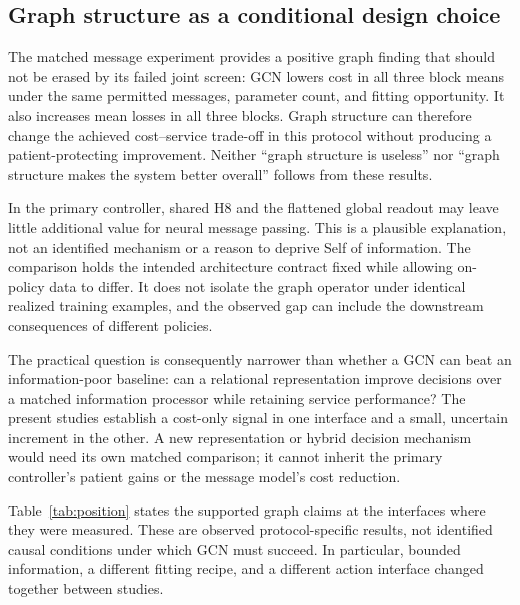\documentclass[preprint,12pt]{elsarticle}
\begin{document}
\subsection{Graph structure as a conditional design choice}
The matched message experiment provides a positive graph finding that should
not be erased by its failed joint screen: GCN lowers cost in all three block
means under the same permitted messages, parameter count, and fitting opportunity.
It also increases mean losses in all three blocks. Graph structure can therefore
change the achieved cost--service trade-off in this protocol without producing
a patient-protecting improvement. Neither ``graph structure is useless'' nor
``graph structure makes the system better overall'' follows from these results.

In the primary controller, shared H8 and the flattened global readout may leave little additional value for
neural message passing. This is a plausible explanation, not an identified
mechanism or a reason to deprive Self of information. The comparison holds the
intended architecture contract fixed while allowing on-policy data to differ.
It does not isolate the graph operator under identical realized training
examples, and the observed gap can include the downstream consequences of
different policies.

The practical question is consequently narrower than whether a GCN can beat
an information-poor baseline: can a relational representation improve decisions
over a matched information processor while retaining service performance?
The present studies establish a cost-only signal in one interface and a small,
uncertain increment in the other. A new representation or hybrid decision
mechanism would need its own matched comparison; it cannot inherit the primary
controller's patient gains or the message model's cost reduction.

Table~\ref{tab:position} states the supported graph claims at the interfaces
where they were measured. These are observed protocol-specific results, not
identified causal conditions under which GCN must succeed. In particular,
bounded information, a different fitting recipe, and a different action
interface changed together between studies.
\end{document}
